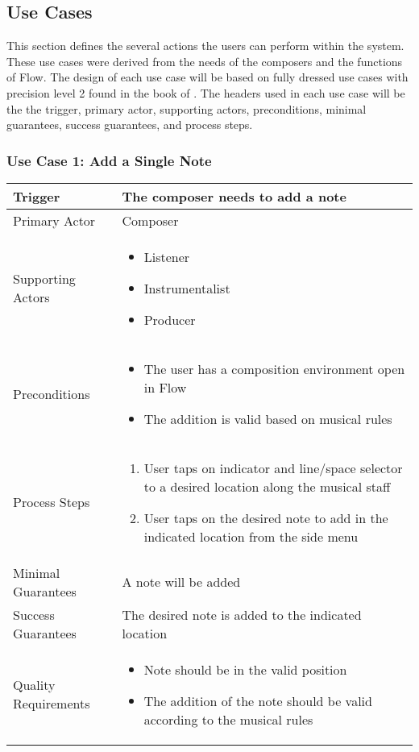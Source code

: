 \subsection{Use Cases}

This section defines the several actions the users can perform within the system. These use cases were derived from the needs of the composers and the functions of Flow. The design of each use case will be based on fully dressed use cases with precision level 2 found in the book of \cite{alistair2001writing}. The headers used in each use case will be the the trigger, primary actor, supporting actors, preconditions, minimal guarantees, success guarantees, and process steps.




\subsubsection{Use Case 1: Add a Single Note}

\begin{tabularx}{\textwidth}{|X|X|}
\hline
Trigger & The composer needs to add a note \\
\hline
Primary Actor & 
Composer \\
\hline
Supporting Actors & 
\begin{itemize}
\item Listener
\item Instrumentalist
\item Producer
\end{itemize} \\
\hline
Preconditions & 
\begin{itemize}
\item The user has a composition environment open in Flow 
\item The addition is valid based on musical rules
\end{itemize} \\
\hline
Process Steps & 
\begin{enumerate}
\item User taps on  indicator and line/space selector to a desired location along the musical staff
\item User taps on the desired note to add in the indicated location from the side menu
\end{enumerate} \\
\hline
Minimal Guarantees & 
A note will be added \\
\hline
Success Guarantees & 
The desired note is added to the indicated location \\
\hline
Quality Requirements &  
\begin{itemize}
\item Note should be in the valid position
\item The addition of the note should be valid according to the musical rules
\end{itemize} \\ 
\hline
\end{tabularx}

